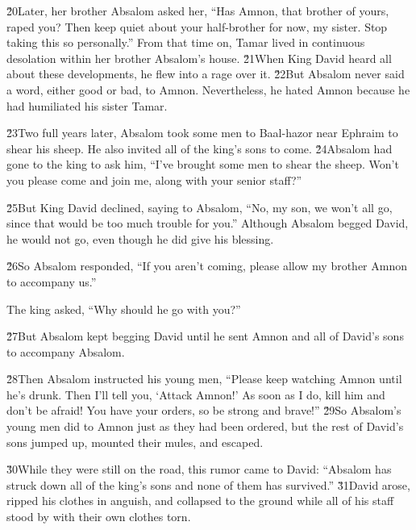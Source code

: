 \v{20}Later, her brother Absalom asked her, ``Has Amnon, that brother of yours, raped you? Then keep quiet about your half-brother for now, my sister. Stop taking this so personally.'' From that time on, Tamar lived in continuous desolation within her brother Absalom's house. \v{21}When King David heard all about these developments, he flew into a rage over it. \v{22}But Absalom never said a word, either good or bad, to Amnon. Nevertheless, he hated Amnon because he had humiliated his sister Tamar.

\v{23}Two full years later, Absalom took some men to Baal-hazor near Ephraim to shear his sheep. He also invited all of the king's sons to come. \v{24}Absalom had gone to the king to ask him, ``I've brought some men to shear the sheep. Won't you please come and join me, along with your senior staff?''

\v{25}But King David declined, saying to Absalom, ``No, my son, we won't all go, since that would be too much trouble for you.'' Although Absalom begged David, he would not go, even though he did give his blessing.

\v{26}So Absalom responded, ``If you aren't coming, please allow my brother Amnon to accompany us.''

The king asked, ``Why should he go with you?''

\v{27}But Absalom kept begging David until he sent Amnon and all of David's sons to accompany Absalom.

\v{28}Then Absalom instructed his young men, ``Please keep watching Amnon until he's drunk. Then I'll tell you, `Attack Amnon!' As soon as I do, kill him and don't be afraid! You have your orders, so be strong and brave!'' \v{29}So Absalom's young men did to Amnon just as they had been ordered, but the rest of David's sons jumped up, mounted their mules, and escaped.

\v{30}While they were still on the road, this rumor came to David: ``Absalom has struck down all of the king's sons and none of them has survived.'' \v{31}David arose, ripped his clothes in anguish, and collapsed to the ground while all of his staff stood by with their own clothes torn.


